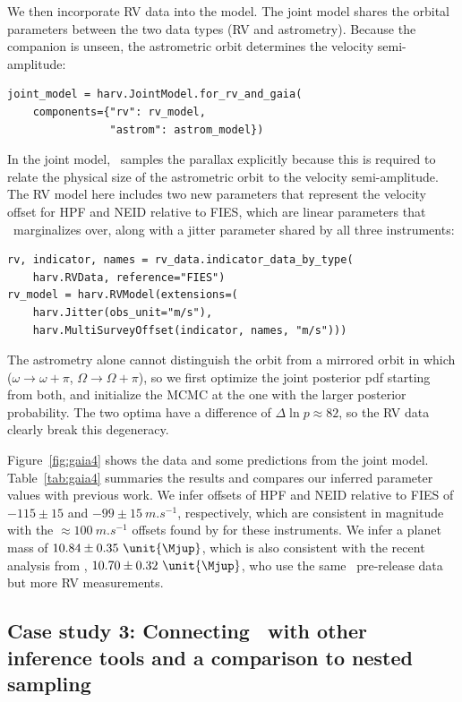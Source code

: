 \documentclass[twocolumn]{AASTeX7/aastex701}
\newcommand{\harv}{\package{harv}}
\begin{document}
We then incorporate RV data into the model.
The joint model shares the orbital parameters between the two data types (RV and
astrometry).
Because the companion is unseen, the astrometric orbit determines the velocity
semi-amplitude:
\begin{lstlisting}
joint_model = harv.JointModel.for_rv_and_gaia(
    components={"rv": rv_model,
                "astrom": astrom_model})
\end{lstlisting}
\noindent
In the joint model, \harv\ samples the parallax explicitly because this is required to
relate the physical size of the astrometric orbit to the velocity semi-amplitude.
The RV model here includes two new parameters that represent the velocity offset for HPF
and NEID relative to FIES, which are linear parameters that \harv\ marginalizes over,
along with a jitter parameter shared by all three instruments:
\begin{lstlisting}
rv, indicator, names = rv_data.indicator_data_by_type(
    harv.RVData, reference="FIES")
rv_model = harv.RVModel(extensions=(
    harv.Jitter(obs_unit="m/s"),
    harv.MultiSurveyOffset(indicator, names, "m/s")))
\end{lstlisting}
\noindent
The astrometry alone cannot distinguish the orbit from a mirrored orbit in which
($\omega \to \omega + \pi$, $\Omega \to \Omega + \pi$), so we first optimize the joint
posterior pdf starting from both, and initialize the MCMC at the one with the larger
posterior probability.
The two optima have a difference of $\Delta \ln p \approx 82$, so the RV data clearly
break this degeneracy.


Figure~\ref{fig:gaia4} shows the data and some predictions from the joint model.
Table~\ref{tab:gaia4} summaries the results and compares our inferred parameter values
with previous work.
We infer offsets of HPF and NEID relative to FIES of $-115 \pm 15$ and
$-99 \pm 15~\unit{m.s^{-1}}$, respectively, which are consistent in magnitude with the
$\approx 100~\unit{m.s^{-1}}$ offsets found by \citet{Kanodia:2026} for these
instruments.
We infer a planet mass of $10.84 \pm 0.35~\unit{\Mjup}$, which is also consistent with
the recent analysis from \citet{Kanodia:2026}, $10.70 \pm 0.32~\unit{\Mjup}$, who use
the same \gaia\ pre-release data but more RV measurements.

\subsection{Case study 3: Connecting \harv\ with other inference tools and a comparison
to nested sampling}
\label{sec:cases-interop}
\end{document}
